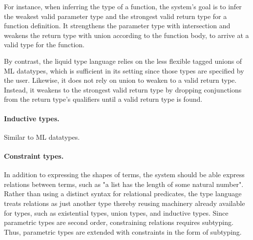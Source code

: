 \documentclass[acmsmall]{acmart}
\theoremstyle{definition}
\begin{document}
For instance, when inferring the type of a function, 
the system's goal is to infer the weakest valid parameter type and the strongest valid return type for a function definition.
It strengthens the parameter type with intersection and weakens the return type with union according to the function body,
to arrive at a valid type for the function.  

By contrast, the liquid type language relies on the less flexible tagged unions of ML datatypes, 
which is sufficient in its setting since those types are specified by the user. 
Likewise, it does not rely on union to weaken to a valid return type. 
Instead, it weakens to the strongest valid return type by dropping conjunctions from 
the return type's qualifiers until a valid return type is found.

\paragraph{Inductive types.} Similar to ML datatypes.

\paragraph{Constraint types.}
In addition to expressing the shapes of terms, the system should be able express relations between terms,
such as "a list has the length of some natural number".
Rather than using a distinct syntax for relational predicates, 
the type language treats relations as just another type thereby reusing machinery already 
available for types, such as existential types, union types, and inductive types.
Since parametric types are second order, constraining relations requires subtyping.
Thus, parametric types are extended with constraints in the form of subtyping.
\end{document}
